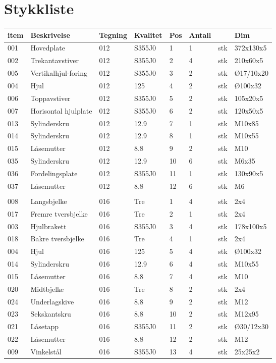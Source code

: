 \chapter{Stykkliste}
\begin{tabular}{|l|l|l|l|l|l|l|l|}
\hline
\bf{item} & \bf{Beskrivelse} & \bf{Tegning} & \bf{Kvalitet} & \bf{Pos} & \bf{Antall} &  & \bf{Dim}\\ \hline
001 & Hovedplate & 012 & S355J0 & 1 & 1 & stk & 372x130x5\\ \hline
002 & Trekantavstiver & 012 & S355J0 & 2 & 4 & stk & 210x60x5\\ \hline
005 & Vertikalhjul-foring & 012 & S355J0 & 3 & 2 & stk & Ø17/10x20\\ \hline
004 & Hjul & 012 & 125 & 4 & 2 & stk & Ø100x32\\ \hline
006 & Toppavstiver & 012 & S355J0 & 5 & 2 & stk & 105x20x5\\ \hline
007 & Horisontal hjulplate & 012 & S355J0 & 6 & 2 & stk & 120x50x5\\ \hline
013 & Sylinderskru & 012 & 12.9 & 7 & 1 & stk & M10x85\\ \hline
014 & Sylinderskru & 012 & 12.9 & 8 & 1 & stk & M10x55\\ \hline
015 & Låsemutter & 012 & 8.8 & 9 & 2 & stk & M10\\ \hline
035 & Sylinderskru & 012 & 12.9 & 10 & 6 & stk & M6x35\\ \hline
036 & Fordelingsplate & 012 & S355J0 & 11 & 1 & stk & 130x90x5\\ \hline
037 & Låsemutter & 012 & 8.8 & 12 & 6 & stk & M6\\ \hline
 &  &  &  &  &  &  & \\ \hline
008 & Langsbjelke & 016 & Tre & 1 & 4 & stk & 2x4\\ \hline
017 & Fremre tversbjelke & 016 & Tre & 2 & 1 & stk & 2x4\\ \hline
003 & Hjulbrakett & 016 & S355J0 & 3 & 4 & stk & 178x100x5\\ \hline
018 & Bakre tversbjelke & 016 & Tre & 4 & 1 & stk & 2x4\\ \hline
004 & Hjul & 016 & 125 & 5 & 4 & stk & Ø100x32\\ \hline
014 & Sylinderskru & 016 & 12.9 & 6 & 4 & stk & M10x55\\ \hline
015 & Låsemutter & 016 & 8.8 & 7 & 4 & stk & M10\\ \hline
020 & Midtbjelke & 016 & Tre & 8 & 2 & stk & 2x4\\ \hline
024 & Underlagskive & 016 & 8.8 & 9 & 2 & stk & M12\\ \hline
023 & Sekskantskru & 016 & 8.8 & 10 & 2 & stk & M12x95\\ \hline
021 & Låsetapp & 016 & S355J0 & 11 & 2 & stk & Ø30/12x30\\ \hline
022 & Låsemutter & 016 & 8.8 & 12 & 2 & stk & M12\\ \hline
009 & Vinkelstål & 016 & S355J0 & 13 & 4 & stk & 25x25x2\\ \hline
\end{tabular}
